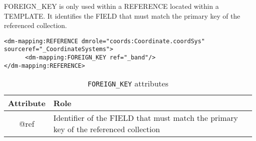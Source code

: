 FOREIGN\_KEY is only used within a REFERENCE located within a TEMPLATE.
It identifies the FIELD that must  match the primary key of the referenced collection.

\begin{lstlisting}[frame=single,caption={The REFERENCE is resolved by the INSTANCE of table \_CoordinateSystems that has a primary key equals to the value of the column  \_band},style=XML,basicstyle=\tiny]
<dm-mapping:REFERENCE dmrole="coords:Coordinate.coordSys" sourceref="_CoordinateSystems">
      <dm-mapping:FOREIGN_KEY ref="_band"/>
</dm-mapping:REFERENCE>
\end{lstlisting}

\begin{table}[!htbp]
\small
\centering
\begin{tabulary}{\linewidth}{|c|J|}       
       \hline 
            \textbf{Attribute} & 
            \textbf {Role}\\
       \hline         \hline  
             @ref& 
             Identifier of the FIELD that must  match the primary key of the referenced collection \\
     \hline
     \end{tabulary}
     \caption{\texttt{FOREIGN\_KEY} attributes} 
     \label{tbl:foreignkey-att}
 \end{table}
